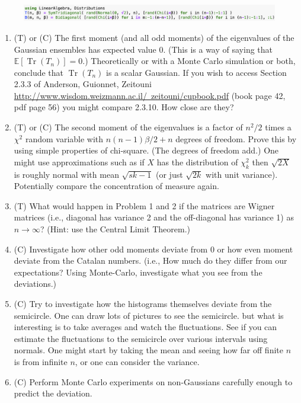 \documentclass{article}
\DeclareMathOperator{\Tr}{Tr}
\begin{document}
\begin{figure}[h]
    \centering
    \includegraphics[width=6in]{code1.png}
\end{figure}

\begin{enumerate}
    \item (T) or (C) The first moment (and all odd moments) of the eigenvalues of the Gaussian ensembles has expected value 0. (This is a way of saying that $\mathbb{E}[\Tr(T_n)]=0$.) Theoretically or with a Monte Carlo simulation or both, conclude that $\Tr(T_n)$ is a scalar Gaussian. If you wish to access  Section 2.3.3 of Anderson, Guionnet, Zeitouni  \href{http://www.wisdom.weizmann.ac.il/~zeitouni/cupbook.pdf}{http://www.wisdom.weizmann.ac.il/~zeitouni/cupbook.pdf} (book page 42, pdf page 56) you might compare 2.3.10. How close are they?
    \item (T) or (C) The second moment of the eigenvalues is a factor of $n^2/2$ times  a $\chi^2$ random variable with $n(n-1)\beta/2+n$ degrees of freedom. Prove this by using simple properties of chi-square. (The degrees of freedom add.) One might use approximations such as if $X$ has the distribution of $\chi_k^2$ then $\sqrt{2X}$ is roughly normal with mean $\sqrt{sk-1}$ (or just $\sqrt{2k}$ with unit variance). Potentially compare the concentration of measure again.
    \item (T) What would happen in Problem 1 and 2 if the matrices are Wigner matrices (i.e., diagonal has variance 2 and the off-diagonal has variance 1) as $n\to \infty$? (Hint: use the Central Limit Theorem.)
    \item (C) Investigate how other odd moments deviate from 0 or how even moment deviate from the Catalan numbers. (i.e., How much do they differ from our expectations? Using Monte-Carlo, investigate what you see from the deviations.)
    \item (C) Try to investigate how the histograms themselves deviate from the semicircle. One can draw lots of pictures to see the semicircle. but what is interesting is to take averages and watch the fluctuations. See if you can estimate the fluctuations to the semicircle over various intervals using normals. One might start by taking the mean and seeing how far off finite $n$ is from infinite $n$, or one can consider the variance.
    \item (C) Perform Monte Carlo experiments on non-Gaussians carefully enough to predict the deviation.
\end{enumerate}
\end{document}
